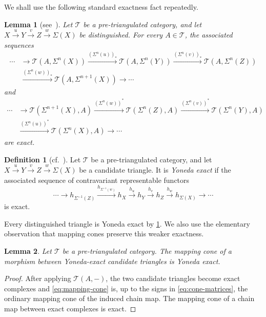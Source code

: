\documentclass[a4paper,11pt,reqno]{amsart}
\newtheorem{lemma}[lemma]{Lemma}
\theoremstyle{definition}
\newtheorem{definition}[definition]{Definition}
\theoremstyle{plain}
\numberwithin{equation}{section}
\newcommand{\T}{\mathcal T}
\begin{document}
We shall use the following standard exactness fact repeatedly.

\begin{lemma}[{\normalfont see~\cite[Lemma~1.1.10 and
Remark~1.1.11]{Neeman2001}}]
\label{lem:representable-exactness}
Let $\T$ be a pre-triangulated category, and let
$X\xrightarrow{u}Y\xrightarrow{v}Z\xrightarrow{w}\Sigma(X)$ be
distinguished.  For every $A\in\T$, the associated sequences
\[
 \begin{aligned}
 \cdots&\longrightarrow\T(A,\Sigma^n(X))
 \xrightarrow{(\Sigma^n(u))_*}\T(A,\Sigma^n(Y))
 \xrightarrow{(\Sigma^n(v))_*}\T(A,\Sigma^n(Z))\\
 &\xrightarrow{(\Sigma^n(w))_*}\T(A,\Sigma^{n+1}(X))
 \longrightarrow\cdots
 \end{aligned}
\]
and
\[
 \begin{aligned}
 \cdots&\longrightarrow\T(\Sigma^{n+1}(X),A)
 \xrightarrow{(\Sigma^n(w))^*}\T(\Sigma^n(Z),A)
 \xrightarrow{(\Sigma^n(v))^*}\T(\Sigma^n(Y),A)\\
 &\xrightarrow{(\Sigma^n(u))^*}\T(\Sigma^n(X),A)
 \longrightarrow\cdots
 \end{aligned}
\]
are exact.
\end{lemma}

\begin{definition}[{\normalfont cf.~\cite[Definition~2.1]{GKO2013}}]
\label{def:yoneda-exact}
Let $\T$ be a pre-triangulated category, and let
$X\xrightarrow{u}Y\xrightarrow{v}Z\xrightarrow{w}\Sigma(X)$ be a candidate
triangle.  It is \emph{Yoneda exact} if the associated sequence of
contravariant representable functors
\[
 \cdots\longrightarrow h_{\Sigma^{-1}(Z)}
 \xrightarrow{h_{\Sigma^{-1}(w)}}h_X
 \xrightarrow{h_u}h_Y\xrightarrow{h_v}h_Z
 \xrightarrow{h_w}h_{\Sigma(X)}\longrightarrow\cdots
\]
is exact.
\end{definition}

Every distinguished triangle is Yoneda exact by
\cref{lem:representable-exactness}.  We also use the elementary observation
that mapping cones preserve this weaker exactness.

\begin{lemma}
\label{lem:cone-exact}
Let $\T$ be a pre-triangulated category.  The mapping cone
of a morphism between Yoneda-exact candidate triangles is Yoneda exact.
\end{lemma}

\begin{proof}
After applying $\T(A,-)$, the two candidate triangles become exact complexes
and \eqref{eq:mapping-cone} is, up to the signs in
\eqref{eq:cone-matrices}, the ordinary mapping cone of the induced chain map.
The mapping cone of a chain map between exact complexes is exact.
\end{proof}
\end{document}
